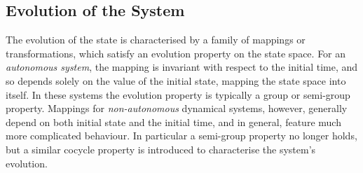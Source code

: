 \subsection{Evolution of the System}

The evolution of the state is characterised by a family of
mappings or transformations, which satisfy an evolution property
on the state space. For an {\em autonomous system}, the mapping is
invariant with respect to the initial time, and so depends solely
on the value of the initial state, mapping the state space into
itself. In these systems the evolution property is typically a
group or semi-group property. Mappings for {\em non-autonomous}
dynamical systems, however, generally depend on both initial state
and the initial time, and in general, feature much more
complicated behaviour. In particular a semi-group property no
longer holds, but a similar cocycle property is introduced to
characterise the system's evolution.

\endinput
